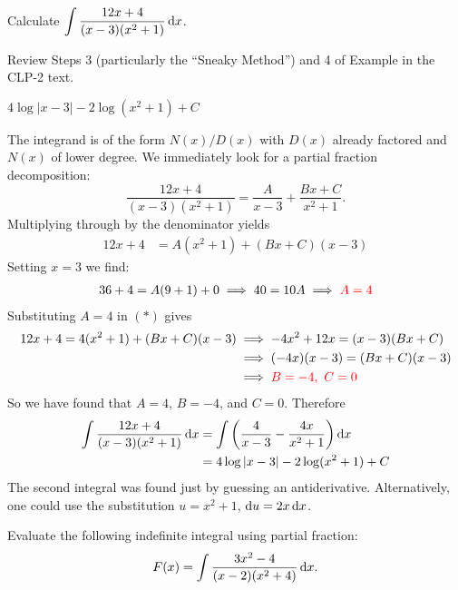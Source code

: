 \begin{Mquestion}[2016A]
Calculate $\displaystyle \int \frac{12x+4}{(x-3)(x^2+1)}\,\mathrm{d}x$.
\end{Mquestion}

\begin{hint}
Review Steps 3 (particularly the ``Sneaky Method'') and 4 of
Example  in the CLP-2 text.
\end{hint}

\begin{answer}
$4 \log |x-3| - 2 \log (x^2 + 1) + C$
\end{answer}

\begin{solution}
The integrand is of the form $N(x)/D(x)$ with $D(x)$ already factored
and $N(x)$ of lower degree. We immediately look for a partial fraction decomposition:
\begin{equation*}
\frac{12x+4}{(x-3)(x^2+1)} = \frac{A}{x-3} + \frac{Bx+C}{x^2+1}.
\end{equation*}
Multiplying through by the denominator yields
\begin{align}
12x+4 &= A(x^2+1) + (Bx+C)(x-3)
\tag{$*$}
\end{align}
Setting $x=3$ we find:
\begin{align*}
   36 +4 = A(9 + 1) + 0 \implies 40 =10A  \implies \color{red}A = 4
\end{align*}
Substituting $A=4$ in $(*)$ gives
\begin{align*}
12x+4 = 4(x^2+1) + (Bx+C)(x-3)
  &\implies   -4x^2+12 x =(x-3)(Bx + C) \\
  &\implies   (-4x)(x-3)=(Bx + C)(x-3) \\
  & \implies  \color{red}B=-4,~C=0
\end{align*}
So we have found that $A=4$, $B=-4$, and $C=0$. Therefore
\begin{align*}
  \int \frac{12x+4}{(x-3)(x^2+1)} \,\mathrm{d}x &= \int \bigg( \frac{4}{x-3} - \frac{4x}{x^2+1} \bigg) \,\mathrm{d}x \\
   &=  4 \log |x-3| - 2 \log (x^2 + 1) + C
\end{align*}
The second integral was found just by guessing an antiderivative.
Alternatively, one could use the substitution $u=x^2+1$, $\mathrm{d}u=2x\,\mathrm{d}x$.
\end{solution}


\begin{question}[2016Q4]
Evaluate the following indefinite integral using partial fraction:
\begin{align*}
F(x) = \int \frac{3x^2 -4}{(x-2)(x^2+4)}\,\mathrm{d}x .
\end{align*}
\end{question}

